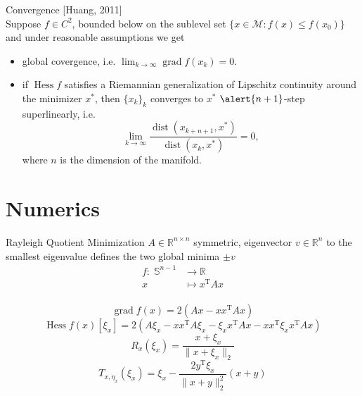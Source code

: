 \documentclass{beamer}
\begin{document}
\begin{frame}{Convergence}
    \vspace{-1\baselineskip}\hfill{\tiny{[Huang, 2011]}} \\[0.2\baselineskip]
    Suppose $f \in C^2$, bounded below on the sublevel set $\{ x \in \mathcal{M} \colon f(x) \leq f(x_0) \}$ and under reasonable assumptions we get 
    \begin{itemize}
        \item \alert{global covergence}, i.e. $\lim_{k \rightarrow \infty} \operatorname{grad} f(x_k) = 0$.
        \item if $\operatorname{Hess} f$ satisfies a Riemannian generalization of Lipschitz continuity around the minimizer $x^*$, then $\{ x_k \}_k$ converges to $x^*$ $\alert{n + 1}$\alert{-step superlinearly}, i.e. \begin{equation*}\lim_{k \rightarrow \infty} \frac{\operatorname{dist}(x_{k+n+1}, x^*)}{\operatorname{dist}(x_k, x^*)} = 0, \end{equation*} where $n$ is the dimension of the manifold.
    \end{itemize}
\end{frame}


\section{Numerics}

\begin{frame}{Rayleigh Quotient Minimization}
    $A \in \mathbb{R}^{n \times n}$ symmetric, eigenvector $v \in \mathbb{R}^n$ to the smallest eigenvalue defines the two global minima $\pm v$
    \begin{equation*}
        \begin{split}
            f \colon \; \mathbb{S}^{n-1} & \to \mathbb{R} \\
            x & \mapsto x^{\mathrm{T}} A x
        \end{split}
    \end{equation*} \\[-0.5\baselineskip]
    \begin{equation*}
        \operatorname{grad} f(x) = 2(Ax - x x^{\mathrm{T}} A x)
    \end{equation*}
    \begin{equation*}
        \operatorname{Hess} f(x) [\xi_x] = 2 (A \xi_x - x x^{\mathrm{T}} A \xi_x - \xi_x x^{\mathrm{T}} A x - x x^{\mathrm{T}} \xi_x x^{\mathrm{T}} A x)
    \end{equation*}
    \begin{equation*}
        R_x (\xi_x) = \frac{x + \xi_x}{\lVert x + \xi_x \rVert_2}
    \end{equation*}
    \begin{equation*}
        T_{x, \eta_x}(\xi_x) = \xi_x - \frac{2 y^{\mathrm{T}} \xi_x}{\lVert x + y \rVert^{2}_2} (x + y)
    \end{equation*}
\end{frame}
\end{document}
